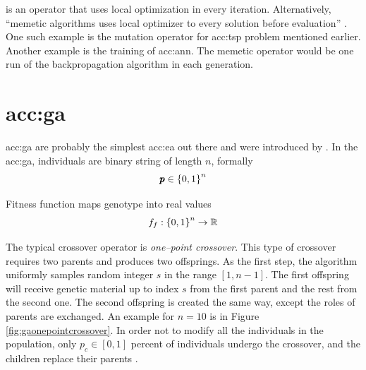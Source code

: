  is an operator that uses local optimization in every iteration. Alternatively, \enquote{memetic algorithms uses local optimizer to every solution before evaluation} \citep{HowToSolveItModernHeuristics}. One such example is the mutation operator for \acrlong{acc:tsp} problem mentioned earlier. Another example is the training of \acrshort{acc:ann}. The memetic operator would be one run of the backpropagation algorithm in each generation.




\section{\texorpdfstring{\acrlong*{acc:ga}}{Genetic Algorithms}}

\acrfull{acc:ga} are probably the simplest \acrfull{acc:ea} out there and were introduced by \citet{HollandGA}. In the \acrshort{acc:ga}, individuals are binary string of length $n$, formally
$$ \pmb{p} \in \left\{0,1\right\}^{n} $$

Fitness function maps genotype into real values
$$ f_f:\left\{0,1\right\}^{n}\rightarrow\mathbb{R} $$

The typical crossover operator is \emph{one--point crossover}. This type of crossover requires two parents and produces two offsprings. As the first step, the algorithm uniformly samples random integer $s$ in the range $\left[ 1, n-1 \right]$. The first offspring will receive genetic material up to index $s$ from the first parent and the rest from the second one. The second offspring is created the same way, except the roles of parents are exchanged. An example for $n=10$ is in Figure \ref{fig:gaonepointcrossover}. In order not to modify all the individuals in the population, only $p_c\in\left[0,1\right]$ percent of individuals undergo the crossover, and the children replace their parents \citep{IntroductionToEA}.

